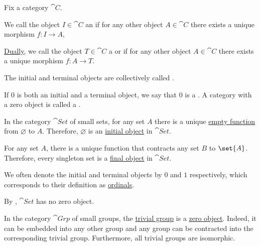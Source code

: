 \begin{definition}\label{def:universal_objects}
  Fix a category \( \cat{C} \).

  \begin{thmenum}
     We call the object \( I \in \cat{C} \) an  if for any other object \( A \in \cat{C} \) there exists a unique morphism \( f: I \to A \),

     \hyperref[thm:categorical_principle_of_duality]{Dually}, we call the object \( T \in \cat{C} \) a  or  if for any other object \( A \in \cat{C} \) there exists a unique morphism \( f: A \to T \).

    The initial and terminal objects are collectively called .

     If \( 0 \) is both an initial and a terminal object, we say that \( 0 \) is a . A category with a zero object is called a .
  \end{thmenum}
\end{definition}

\begin{example}\label{ex:def:universal_objects}
  \begin{thmenum}
     In the category \hyperref[def:category_of_small_sets]{\( \cat{Set} \)} of small sets, for any set \( A \) there is a unique \hyperref[def:multi_valued_function/empty]{empty function} from \( \varnothing \) to \( A \). Therefore, \( \varnothing \) is an \hyperref[def:universal_objects/initial]{initial object} in \( \cat{Set} \).

    For any set \( A \), there is a unique function that contracts any set \( B \) to \( \set{ A } \). Therefore, every singleton set is a \hyperref[def:universal_objects/terminal]{final object} in \( \cat{Set} \).

    We often denote the initial and terminal objects by \( 0 \) and \( 1 \) respectively, which corresponds to their definition as \hyperref[def:ordinal]{ordinals}.

    By , \( \cat{Set} \) has no zero object.

     In the category \hyperref[def:group/category]{\( \cat{Grp} \)} of small groups, the \hyperref[def:group/trivial]{trivial group} is a \hyperref[def:universal_objects/zero]{zero object}. Indeed, it can be embedded into any other group and any group can be contracted into the corresponding trivial group. Furthermore, all trivial groups are isomorphic.
  \end{thmenum}
\end{example}

